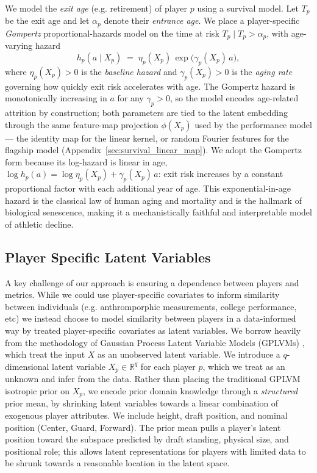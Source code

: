 \documentclass[aoas]{imsart}
\begin{document}
We model the  \emph{exit age} (e.g. retirement) of player $p$ using a survival model.  Let $T_p$ be the exit age and let $\alpha_p$ denote their \emph{entrance age}.  We place a player-specific \emph{Gompertz} proportional-hazards model on the time at risk $T_p \mid T_p > \alpha_p$, with age-varying hazard
\begin{equation}
    h_p(a \mid X_p) \;=\; \eta_p(X_p)\,\exp\!\bigl(\gamma_p(X_p)\,a\bigr),
    \label{eq:gompertz}
\end{equation}
where $\eta_p(X_p) > 0$ is the \emph{baseline hazard} and $\gamma_p(X_p) > 0$ is the \emph{aging rate} governing how quickly exit risk accelerates with age.  The Gompertz hazard is monotonically increasing in $a$ for any $\gamma_p > 0$, so the model encodes age-related attrition by construction; both parameters are tied to the latent embedding through the same feature-map projection $\phi(X_p)$ used by the performance model --- the identity map for the linear kernel, or random Fourier features for the flagship model (Appendix~\ref{sec:survival_linear_map}).
We adopt the Gompertz form because its log-hazard is linear in age, $\log h_p(a) = \log\eta_p(X_p) + \gamma_p(X_p)\,a$: exit risk increases by a constant proportional factor with each additional year of age.  This exponential-in-age hazard is the classical law of human aging and mortality and is the hallmark of biological senescence, making it a mechanistically faithful and interpretable model of athletic decline.

\subsection{Player Specific Latent Variables}
\label{sec:player_similarity}

A key challenge of our approach is ensuring a dependence between players and metrics. While we could use player-specific covariates to inform similarity between individuals (e.g. anthromporphic measurements, college performance, etc) we instead choose to model similarity between players in a data-informed way by treated player-specific covariates as latent variables. We borrow heavily from the methodology of Gaussian Process Latent Variable Models (GPLVMs) \cite{JMLR:v6:lawrence05a}, which treat the input $X$ as an unobserved latent variable. We introduce a $q$-dimensional latent variable $X_p \in \mathbb{R}^q$ for each player $p$, which we treat as an unknown and infer from the data. Rather than placing the traditional GPLVM isotropic prior on $X_p$, we encode prior domain knowledge through a \emph{structured} prior mean, by shrinking latent variables towards a linear combination of exogenous player attributes. We include height, draft position, and nominal position (Center, Guard, Forward). The prior mean pulls a player's latent position toward the subspace predicted by draft standing, physical size, and positional role; this allows latent representations for players with limited data to be shrunk towards a reasonable location in the latent space. 
\end{document}
